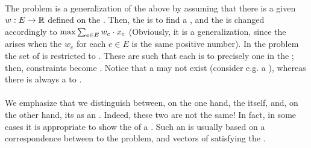 \paragraph{}
The  problem is a generalization of the  above by assuming that there is a given  $\funsig{w}{E}{\RRR}$ defined on the . Then, the  is to find a , and the  is changed accordingly to $\max\isumdomain[e]{E}{w_e\cdot x_e}$ (Obviously, it is a generalization, since the  arises when the  $w_e$ for each $e\in E$ is the same positive number). In the  problem the set of  is restricted to . These are  such that each  is  to precisely one  in the ; then, constraints  become . Notice that a  may not exist (consider e.g. a ), whereas there is always a  to .

\paragraph{}
We emphasize that we distinguish between, on the one hand, the  itself, and, on the other hand, its  as an . Indeed, these two are not the same! In fact, in some cases it is appropriate to show the  of a . Such an  is usually based on a correspondence between  to the problem, and vectors of  satisfying the .

